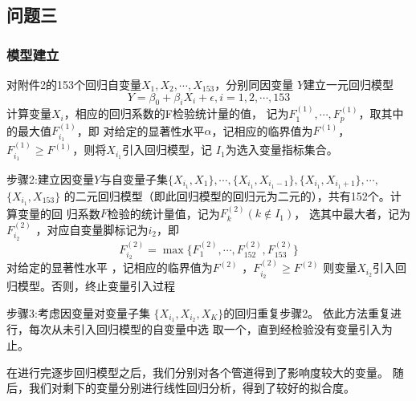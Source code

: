     \subsection{问题三}
        \subsubsection{模型建立}
        对附件2的153个回归自变量$X_1,X_2,\cdots,X_{153}$，分别同因变量
        $Y$建立一元回归模型
        \begin{equation}
            Y = \beta_0 + \beta_iX_i + \epsilon, i = 1,2,\cdots, 153
        \end{equation}
        计算变量$X_i$，相应的回归系数的F检验统计量的值，
        记为$F_1^{(1)},\cdots,F_p^{(1)}$，取其中的最大值$F_{i_1}^{(1)}$，即
        对给定的显著性水平$\alpha$，记相应的临界值为$F^(1)$，
        $F_{i_1}^{(1)} \geqslant F^{(1)}$，则将$X_{i_1}$引入回归模型，记
        $I_1$为选入变量指标集合。\par
        步骤2:建立因变量$Y$与自变量子集$\{X_{i_1},X_1\},\cdots,
        \{X_{i_1},X_{i_1-1}\},\{X_{i_1},X_{i_1+1}\},\cdots,$
        $\{X_{i_1},X_{153}\}$
         的二元回归模型（即此回归模型的回归元为二元的），共有152个。计算变量的回
        归系数$F$检验的统计量值，记为$F_k^{(2)}(k\notin I_1)$，
        选其中最大者，记为 $F_{i_2}^{(2)}$
        ，对应自变量脚标记为$i_2$，即
        \begin{equation}
            F_{i_2}^{(2)} = \max \{F_1^{(2)},\cdots,F_{152}^{(2)},F_{153}^{(2)} \}
        \end{equation}
        对给定的显著性水平 ，记相应的临界值为$F^{(2)}$ ，$F_{i_2}^{(2)} \geqslant F^{(2)}$ 
        则变量$X_{i_2}$引入回归模型。否则，终止变量引入过程\par
        步骤3:考虑因变量对变量子集  $\{X_{i_1},X_{i_2},X_K\}$的回归重复步骤2。
        依此方法重复进行，每次从未引入回归模型的自变量中选
        取一个，直到经检验没有变量引入为止。\par
        在进行完逐步回归模型之后，我们分别对各个管道得到了影响度较大的变量。
        随后，我们对剩下的变量分别进行线性回归分析，得到了较好的拟合度。
